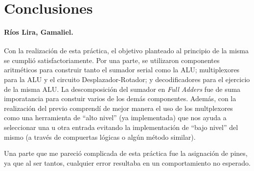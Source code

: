 \documentclass[../main.tex]{subfiles}
\begin{document}
\clearpage
\section{Conclusiones}
\paragraph{Ríos Lira, Gamaliel.}
Con la realización de esta práctica, el objetivo planteado al principio de la 
misma se cumplió satisfactoriamente. Por una parte, se utilizaron componentes 
aritméticos para construir tanto el sumador serial como la ALU; multiplexores 
para la ALU y el circuito Desplazador-Rotador; y decodificadores para el 
ejercicio de la misma ALU. La descomposición del sumador en \textit{Full 
Adders} fue de suma imporatancia para constuir varios de los demás 
componentes. Además, con la realización del previo comprendí de mejor manera 
el uso de los multplexores como una herramienta de ``alto nivel'' (ya 
implementada) que nos ayuda a seleccionar una u otra entrada evitando la 
implementación de ``bajo nivel'' del mismo (a través de compuertas lógicas o 
algún método similar).

Una parte que me pareció complicada de esta práctica fue la asignación de 
pines, ya que al ser tantos, cualquier error resultaba en un comportamiento no 
esperado.
\end{document}
